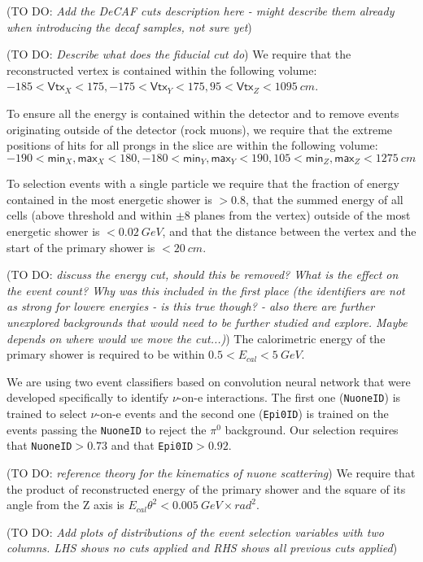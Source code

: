 \documentclass[12pt]{article}
\newcommand{\todo }[1]{({\color{red}\sc TO DO: \textit{#1}})}
\begin{document}
\todo{Add the DeCAF cuts description here - might describe them already when introducing the decaf samples, not sure yet}

\todo{Describe what does the fiducial cut do}
We require that the reconstructed vertex is contained within the following volume: $-185<\textsf{Vtx}_X<175,-175<\textsf{Vtx}_Y<175, 95<\textsf{Vtx}_Z<1095\ \unit{cm}$.

To ensure all the energy is contained within the detector and to remove events originating outside of the detector (rock muons), we require that the extreme positions of hits for all prongs in the slice are within the following volume: $-190<\textsf{min}_X, \textsf{max}_X<180, -180<\textsf{min}_Y, \textsf{max}_Y<190, 105<\textsf{min}_Z, \textsf{max}_Z<1275\ \unit{cm}$

To selection events with a single particle we require that the fraction of energy contained in the most energetic shower is $>0.8$, that the summed energy of all cells (above threshold and within $\pm8$ planes from the vertex) outside of the most energetic shower is $<0.02\ \unit{GeV}$, and that the distance between the vertex and the start of the primary shower is $<20\ \unit{cm}$.

\todo{discuss the energy cut, should this be removed? What is the effect on the event count? Why was this included in the first place (the identifiers are not as strong for lowere energies - is this true though? - also there are further unexplored backgrounds that would need to be further studied and explore. Maybe depends on where would we move the cut...)}
The calorimetric energy of the primary shower is required to be within $0.5<E_{cal}<5\ \unit{GeV}$.

We are using two event classifiers based on convolution neural network that were developed specifically to identify $\nu$-on-e interactions. The first one (\texttt{NuoneID}) is trained to select $\nu$-on-e events and the second one (\texttt{Epi0ID}) is trained on the events passing the \texttt{NuoneID} to reject the $\pi^0$ background. Our selection requires that \texttt{NuoneID}$>0.73$ and that \texttt{Epi0ID}$>0.92$.

\todo{reference theory for the kinematics of nuone scattering}
We require that the product of reconstructed energy of the primary shower and the square of its angle from the Z axis is $E_{cal}\theta^2<0.005\ \unit{GeV\times rad^2}$.

\todo{Add plots of distributions of the event selection variables with two columns. LHS shows no cuts applied and RHS shows all previous cuts applied}
\end{document}

